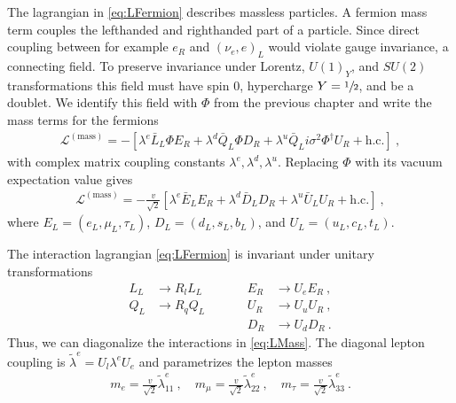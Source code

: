The lagrangian in \eqref{eq:LFermion} describes massless particles. A fermion mass term couples the lefthanded and righthanded part of a particle. Since direct coupling between for example $e_R$ and $(\nu_e,e)_L$ would violate gauge invariance, a connecting field. To preserve invariance under Lorentz, $U(1)_Y$, and $SU(2)$ transformations this field must have spin 0, hypercharge $Y=\sfrac{1}{2}$, and be a doublet. We identify this field with $\Phi$ from the previous chapter and write the mass terms for the fermions
\begin{align}
	\mathcal{L}^{(\text{mass})} = -\left[\lambda^e \bar{L}_L\Phi E_R  + \lambda^d\bar{Q}_L\Phi D_R + \lambda^u\bar{Q}_Li\sigma^2\Phi^\dagger U_R + \text{h.c.}\right] \ ,
\end{align}
with complex matrix coupling constants $\lambda^e,\lambda^d,\lambda^u$. Replacing $\Phi$ with its vacuum expectation value gives
\begin{align}\label{eq:LMass}
	\mathcal{L}^{(\text{mass})} = -\frac{v}{\sqrt{2}}\left[\lambda^e \bar{E}_L E_R  + \lambda^d\bar{D}_L D_R + \lambda^u\bar{U}_L U_R + \text{h.c.}\right] \ ,
\end{align}
where $E_L = (e_L,\mu_L,\tau_L)$, $D_L = (d_L,s_L,b_L)$, and $U_L = (u_L,c_L,t_L)$.


The interaction lagrangian \eqref{eq:LFermion} is invariant under unitary transformations
\begin{align}
	L_L &\rightarrow R_lL_L &&\quad &E_R &\rightarrow U_eE_R \ , \\
	Q_L &\rightarrow R_qQ_L &&\quad &U_R &\rightarrow U_uU_R \ , \\
	& && &D_R &\rightarrow U_dD_R \ .
\end{align}
Thus, we can diagonalize the interactions in \eqref{eq:LMass}. The diagonal lepton coupling is $\tilde{\lambda}^e = U_l\lambda^eU_e$ and parametrizes the lepton masses
\begin{align}
	m_e = \frac{v}{\sqrt{2}}\tilde{\lambda}_{11}^e \ , \quad m_\mu = \frac{v}{\sqrt{2}}\tilde{\lambda}_{22}^e \ , \quad m_\tau = \frac{v}{\sqrt{2}}\tilde{\lambda}_{33}^e \ .
\end{align}



